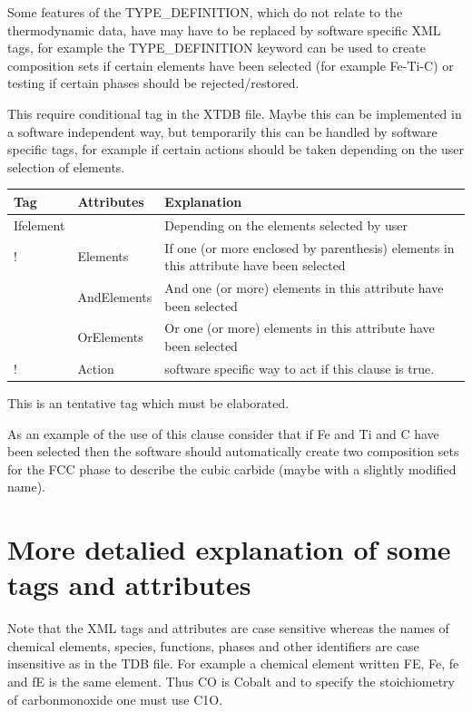 \documentclass{article}
\begin{document}
Some features of the TYPE\_DEFINITION, which do not relate to the
thermodynamic data, have may have to be replaced by software specific
XML tags, for example the TYPE\_DEFINITION keyword can be used to
create composition sets if certain elements have been selected (for
example Fe-Ti-C) or testing if certain phases should be
rejected/restored.

This require conditional tag in the XTDB file.  Maybe this can be
implemented in a software independent way, but temporarily this can be
handled by software specific tags, for example if certain actions
should be taken depending on the user selection of elements.

\bigskip
\begin{tabular}{|p{} p{} p{}|}\hline
  Tag & Attributes &  Explanation\\\hline

  Ifelement & & Depending on the elements selected by user\\
!      & Elements & If one (or more enclosed by parenthesis) elements 
                  in this attribute have been selected\\
      & AndElements & And one (or more) elements in this attribute have
                     been selected\\
      & OrElements & Or one (or more) elements in this attribute have
                     been selected\\
!      & Action & software specific way to act if this clause is true.\\\hline
  
\end{tabular}

This is an tentative tag which must be elaborated.

As an example of the use of this clause consider that if Fe and Ti and
C have been selected then the software should automatically create two
composition sets for the FCC phase to describe the cubic carbide
(maybe with a slightly modified name).

\section{More detalied explanation of some tags and attributes}\label{sec:attributes}

Note that the XML tags and attributes are case sensitive whereas the
names of chemical elements, species, functions, phases and other
identifiers are case insensitive as in the TDB file.  For example a
chemical element written FE, Fe, fe and fE is the same element.  Thus
CO is Cobalt and to specify the stoichiometry of carbonmonoxide one
must use C1O.
\end{document}
